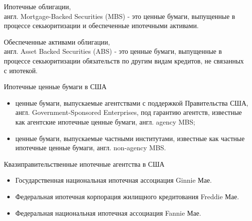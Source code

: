 \documentclass[_Banking_p2.tex]{subfiles}
\begin{document}
\begin{frame}
\begin{block}{Ипотечные облигации,\\ англ. Mortgage-Backed Securities (MBS)}
\quad
- это ценные бумаги, выпущенные в процессе секьюритизации и обеспеченные ипотечными активами.
\end{block}

\begin{block}{Обеспеченные активами облигации,\\ англ. Asset Backed Securities (ABS)}
\quad
- это ценные бумаги, выпущенные в процессе секьюритизации обязательств по другим видам кредитов, не связанных с ипотекой.
\end{block}
\end{frame}

\begin{frame} {Ипотечные ценные бумаги в США}
\begin{itemize}[<	+->]

\item
ценные бумаги, выпускаемые агентствами с поддержкой Правительства США, англ. Government-Sponsored Enterprises, под гарантию агентств, известные как агентские ипотечные ценные бумаги, англ. agency MBS;

\item
ценные бумаги, выпускаемые частными институтами, известные как частные ипотечные ценные бумаги, англ. non-agency MBS.
\end{itemize}
\end{frame}

\begin{frame}{Квазиправительственные ипотечные агентства в США}
\begin{itemize}[<+->]
\item
Государственная национальная ипотечная ассоциация Ginnie Мае.
\item
Федеральная ипотечная корпорация жилищного кредитования Freddie Мае.
\item
Федеральная национальная ипотечная ассоциация Fannie Мае.
\end{itemize}
\end{frame}
\end{document}

